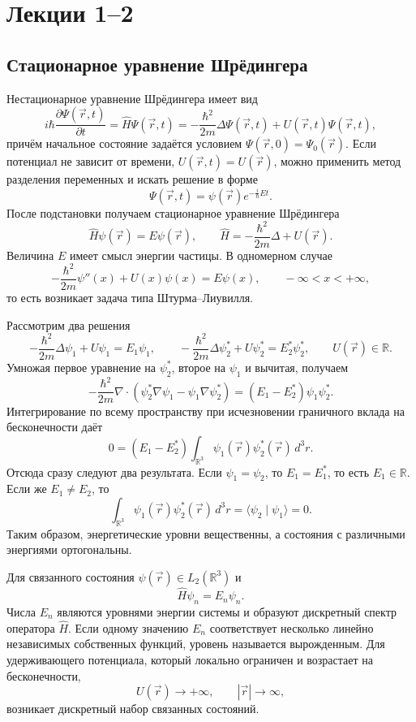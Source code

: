 \documentclass[12pt,a4paper]{article}
\begin{document}
\tableofcontents
\clearpage

\section{Лекции 1--2}

\subsection{Стационарное уравнение Шрёдингера}

Нестационарное уравнение Шрёдингера имеет вид
\[
    i\hbar\frac{\partial\Psi(\vec r,t)}{\partial t}
    =\hat H\Psi(\vec r,t)
    =-\frac{\hbar^2}{2m}\Delta\Psi(\vec r,t)+U(\vec r,t)\Psi(\vec r,t),
\]
причём начальное состояние задаётся условием $\Psi(\vec r,0)=\Psi_0(\vec r)$.
Если потенциал не зависит от времени, $U(\vec r,t)=U(\vec r)$, можно применить
метод разделения переменных и искать решение в форме
\[
    \Psi(\vec r,t)=\psi(\vec r)e^{-\frac{i}{\hbar}Et}.
\]
После подстановки получаем стационарное уравнение Шрёдингера
\[
    \boxed{\hat H\psi(\vec r)=E\psi(\vec r)},
    \qquad
    \hat H=-\frac{\hbar^2}{2m}\Delta+U(\vec r).
\]
Величина $E$ имеет смысл энергии частицы. В одномерном случае
\[
    -\frac{\hbar^2}{2m}\psi''(x)+U(x)\psi(x)=E\psi(x),
    \qquad -\infty<x<+\infty,
\]
то есть возникает задача типа Штурма--Лиувилля.

Рассмотрим два решения
\[
    -\frac{\hbar^2}{2m}\Delta\psi_1+U\psi_1=E_1\psi_1,
    \qquad
    -\frac{\hbar^2}{2m}\Delta\psi_2^*+U\psi_2^*=E_2^*\psi_2^*,
    \qquad U(\vec r)\in\mathbb R.
\]
Умножая первое уравнение на $\psi_2^*$, второе на $\psi_1$ и вычитая,
получаем
\[
    -\frac{\hbar^2}{2m}\nabla\!\cdot\!
    \left(\psi_2^*\nabla\psi_1-\psi_1\nabla\psi_2^*\right)
    =(E_1-E_2^*)\psi_1\psi_2^*.
\]
Интегрирование по всему пространству при исчезновении граничного вклада
на бесконечности даёт
\[
    0=(E_1-E_2^*)\int_{\mathbb R^3}\psi_1(\vec r)\psi_2^*(\vec r)\,d^3r.
\]
Отсюда сразу следуют два результата. Если $\psi_1=\psi_2$, то $E_1=E_1^*$,
то есть $E_1\in\mathbb R$. Если же $E_1\neq E_2$, то
\[
    \int_{\mathbb R^3}\psi_1(\vec r)\psi_2^*(\vec r)\,d^3r
    =\langle\psi_2\mid\psi_1\rangle=0.
\]
Таким образом, энергетические уровни вещественны, а состояния с различными
энергиями ортогональны.

Для связанного состояния $\psi(\vec r)\in L_2(\mathbb R^3)$ и
\[
    \hat H\psi_n=E_n\psi_n.
\]
Числа $E_n$ являются уровнями энергии системы и образуют дискретный спектр
оператора $\hat H$. Если одному значению $E_n$ соответствует несколько
линейно независимых собственных функций, уровень называется вырожденным.
Для удерживающего потенциала, который локально ограничен и возрастает
на бесконечности,
\[
    U(\vec r)\longrightarrow+\infty,
    \qquad |\vec r|\longrightarrow\infty,
\]
возникает дискретный набор связанных состояний.
\end{document}
